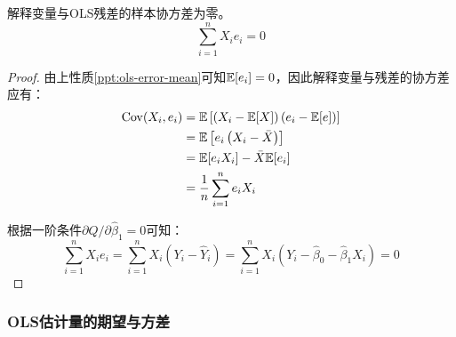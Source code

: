 \documentclass[11pt]{article}
\begin{document}
\begin{property}
    解释变量与OLS残差的样本协方差为零。
    \begin{equation*}
        \sum_{i=1}^{n} X_i e_i = 0
    \end{equation*}

    \begin{proof}
        由上性质\ref{ppt:ols-error-mean}可知$\mathbb{E}[e_i]=0$，因此解释变量与残差的协方差应有：
        \begin{align*}
            \operatorname{Cov}(X_i,e_i) &= \mathbb{E}\left[\left(X_i - \mathbb{E}[X]\right)\left(e_i - \mathbb{E}[e]\right)\right] \\
            &= \mathbb{E} \left[e_i \left(X_i - \bar{X}\right) \right] \\
            &= \mathbb{E}[e_i X_i] - \bar{X}\mathbb{E}[e_i] \\
            &= \frac{1}{n} \sum_{i=1}^{n} e_i X_i
        \end{align*}
    
        根据一阶条件$\partial Q / \partial \hat{\beta}_1 = 0$可知：
        \begin{equation*}
            \sum_{i=1}^{n} X_i e_i = \sum_{i=1}^{n} X_i \left(Y_i - \hat{Y}_i\right) = \sum_{i=1}^{n} X_i \left(Y_i - \hat{\beta}_0 - \hat{\beta}_1 X_i\right) = 0
        \end{equation*}
    \end{proof}
\end{property}

\subsubsection{OLS估计量的期望与方差}
\end{document}
